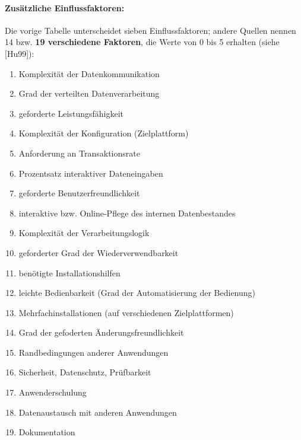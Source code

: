 \paragraph{Zusätzliche Einflussfaktoren:}
Die vorige Tabelle unterscheidet sieben Einflussfaktoren; andere Quellen nennen 14 bzw. \textbf{19 verschiedene Faktoren}, die Werte von 0 bis 5 erhalten (siehe [Hu99]):
\begin{enumerate}
	\item Komplexität der Datenkommunikation
	\item Grad der verteilten Datenverarbeitung
	\item geforderte Leistungsfähigkeit
	\item Komplexität der Konfiguration (Zielplattform)
	\item Anforderung an Transaktionsrate
	\item Prozentsatz interaktiver Dateneingaben
	\item geforderte Benutzerfreundlichkeit
	\item interaktive bzw. Online-Pflege des internen Datenbestandes
	\item Komplexität der Verarbeitungslogik
	\item geforderter Grad der Wiederverwendbarkeit
	\item benötigte Installationshilfen
	\item leichte Bedienbarkeit (Grad der Automatisierung der Bedienung)
	\item Mehrfachinstallationen (auf verschiedenen Zielplattformen)
	\item Grad der gefoderten Änderungsfreundlichkeit
	\item Randbedingungen anderer Anwendungen
	\item Sicherheit, Datenschutz, Prüfbarkeit
	\item Anwenderschulung
	\item Datenaustausch mit anderen Anwendungen
	\item Dokumentation
\end{enumerate}

